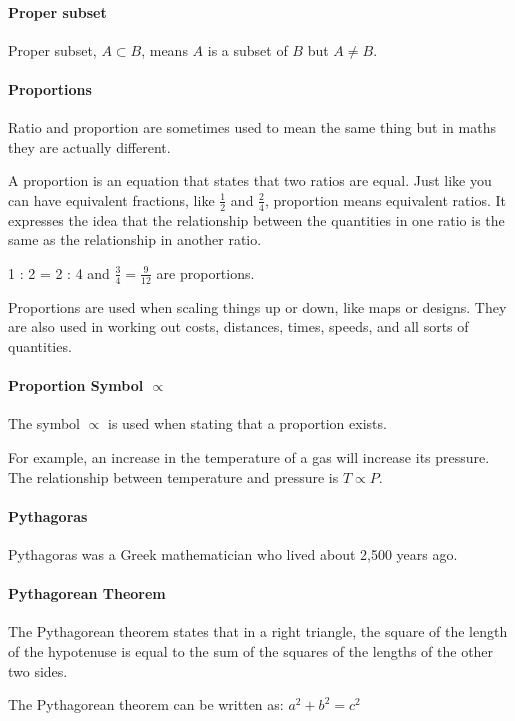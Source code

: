 \documentclass[12pt]{article}
\begin{document}
{\paragraph{Proper subset}
Proper subset, \(A \subset B\), means \(A\) is a subset of \(B\) but \(A \neq B\).

\paragraph{Proportions}
Ratio and proportion are sometimes used to mean the same thing but in maths they are actually different.

A proportion is an equation that states that two ratios are equal. Just like you can have equivalent fractions, like $\frac{1}{2}$ and $\frac{2}{4}$, proportion means equivalent ratios. It expresses the idea that the relationship between the quantities in one ratio is the same as the relationship in another ratio.

1 : 2 = 2 : 4 and $\frac{3}{4}=\frac{9}{12}$ are proportions.

Proportions are used when scaling things up or down, like maps or designs. They are also used in working out costs, distances, times, speeds, and all sorts of quantities.

\paragraph{Proportion Symbol $\propto$}
The symbol $\propto$ is used when stating that a proportion exists.

For example, an increase in the temperature of a gas will increase its pressure. The relationship between temperature and pressure is $T \propto P$.

\paragraph{Pythagoras} Pythagoras was a Greek mathematician who lived about 2,500 years ago.

\paragraph{Pythagorean Theorem}
The Pythagorean theorem states that in a right triangle, the square of the length of the hypotenuse is equal to the sum of the squares of the lengths of the other two sides.

The Pythagorean theorem can be written as: \boldmath$a^2 + b^2 = c^2$\unboldmath

}
\end{document}
